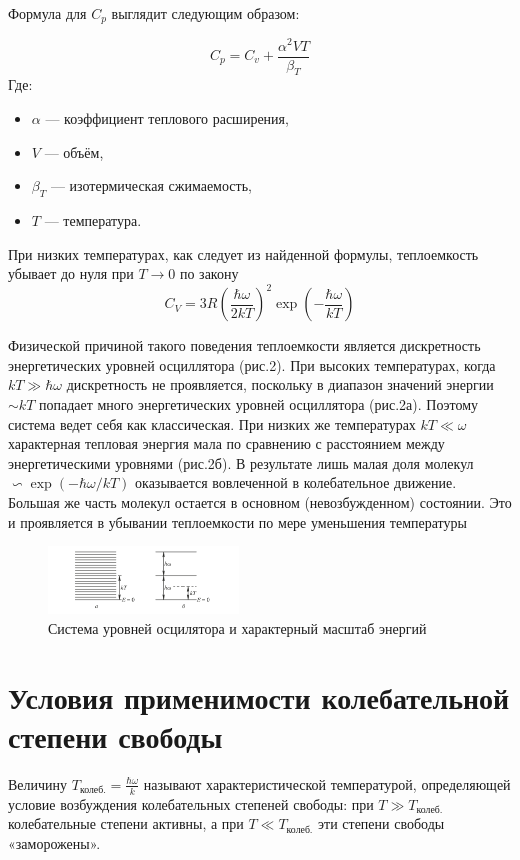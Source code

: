 \documentclass[a4paper]{article}
\begin{document}
Формула для $C_{p}$ выглядит следующим образом:

\[C_{p} = C_{v}+ \frac{\alpha^{2}VT}{\beta_{T}}\]
\newpage
Где:

\begin{itemize}
    \item $\alpha$ — коэффициент теплового расширения,
    \item $V$ — объём,
    \item $\beta_T$ — изотермическая сжимаемость,
    \item $T$ — температура.
\end{itemize}

При низких температурах, как следует из найденной формулы,
теплоемкость убывает до нуля при $T\rightarrow 0$ по закону
\[C_{V} = 3R(\frac{\hbar \omega}{2kT})^{2}\exp(-\frac{\hbar \omega}{kT})\]

Физической причиной такого поведения теплоемкости является
дискретность энергетических уровней осциллятора (рис.2).
При высоких температурах, когда $kT \gg  \hbar \omega$ дискретность не проявляется, поскольку в диапазон значений энергии $\sim kT$ попадает много энергетических уровней осциллятора (рис.2а).
Поэтому система ведет себя как классическая. При низких же температурах
$kT\ll \omega$характерная тепловая энергия мала по сравнению с расстоянием между энергетическими уровнями (рис.2б). В результате
лишь малая доля молекул $\backsim \exp (-\hbar \omega/kT)$ оказывается вовлеченной
в колебательное движение. Большая же часть молекул остается в основном (невозбужденном) состоянии. Это и проявляется в убывании
теплоемкости по мере уменьшения температуры

\begin{figure}[htbp]
    \centering
    \includegraphics[width=0.45\textwidth]{pick2.png}
    \caption{Система уровней осцилятора и характерный масштаб энергий}
    \label{fig:example}
\end{figure}

\section{Условия применимости колебательной степени свободы}

Величину $T_{\text{колеб.}}= \frac{\hbar \omega}{k}$ называют характеристической температурой, определяющей условие возбуждения колебательных 
степеней свободы: при $T\gg T_{\text{колеб.}}$ колебательные степени активны, а при
$T\ll  T_{\text{колеб.}}$ эти степени свободы «заморожены».
\end{document}
